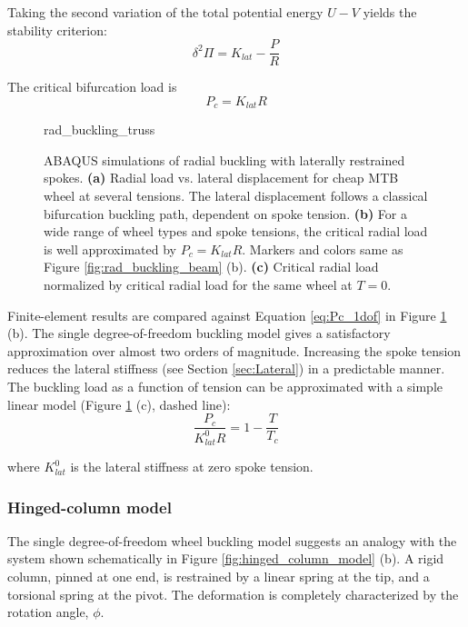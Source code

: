 \documentclass[\rootdir/thesis.tex]{subfiles}
\begin{document}
Taking the second variation of the total potential energy $U-V$ yields the stability criterion:
\begin{equation}
\label{eq:ddPi_1dof}
\delta^2 \Pi = K_{lat} - \frac{P}{R}
\end{equation}

The critical bifurcation load is
\begin{equation}
\label{eq:Pc_1dof}
P_c = K_{lat}R
\end{equation}

\begin{figure}[h]
\centering
{rad_buckling_truss} 
\caption{ABAQUS simulations of radial buckling with laterally restrained spokes. \textbf{(a)} Radial load vs. lateral displacement for cheap MTB wheel at several tensions. The lateral displacement follows a classical bifurcation buckling path, dependent on spoke tension. \textbf{(b)} For a wide range of wheel types and spoke tensions, the critical radial load is well approximated by $P_c = K_{lat}R$. Markers and colors same as Figure \ref{fig:rad_buckling_beam} (b). \textbf{(c)} Critical radial load normalized by critical radial load for the same wheel at $T=0$.}
\label{fig:rad_buckling_truss}
\end{figure}

Finite-element results are compared against Equation \eqref{eq:Pc_1dof} in Figure \ref{fig:rad_buckling_truss} (b). The single degree-of-freedom buckling model gives a satisfactory approximation over almost two orders of magnitude. Increasing the spoke tension reduces the lateral stiffness (see Section \ref{sec:Lateral}) in a predictable manner. The buckling load as a function of tension can be approximated with a simple linear model (Figure \ref{fig:rad_buckling_truss} (c), dashed line):
\begin{equation}
\label{eq:P_c_T}
\frac{P_c}{K_{lat}^0 R} = 1 - \frac{T}{T_c}
\end{equation}

where $K_{lat}^0$ is the lateral stiffness at zero spoke tension.

\subsubsection{Hinged-column model}

The single degree-of-freedom wheel buckling model suggests an analogy with the system shown schematically in Figure \ref{fig:hinged_column_model} (b). A rigid column, pinned at one end, is restrained by a linear spring at the tip, and a torsional spring at the pivot. The deformation is completely characterized by the rotation angle, $\phi$.
\end{document}

